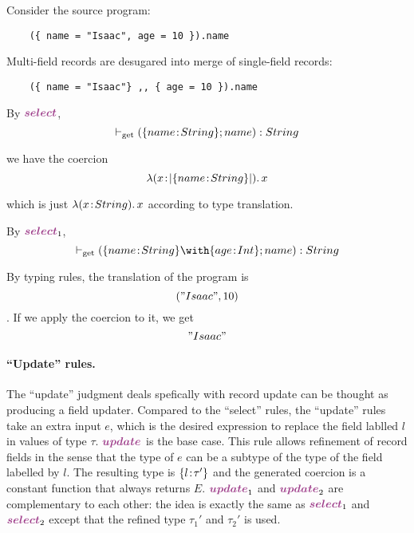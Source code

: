   Consider the source program:
  \begin{lstlisting}
    ({ name = "Isaac", age = 10 }).name
  \end{lstlisting}

  Multi-field records are desugared into merge of single-field records:
  \begin{lstlisting}
    ({ name = "Isaac"} ,, { age = 10 }).name
  \end{lstlisting}

  By $ \rulelabelselect $,
  \[ \vdash_{\textrm{get}} (\{ name \!:\! String \}; {name}) : String \]

  we have the coercion
  \[ \lambda (x \!:\! \lvert \{ name \!:\! String \} \rvert).\, x \]

  which is just $ \lambda (x \!:\! String).\, x $ according to type translation.

  By $ \rulelabelselectleft $,
  \[ \turnsget (\recty {name} {String} \andop \recty {age} {Int}; {name}) : String \]


  By typing rules, the translation of the program is
  \[ ("Isaac", 10) \]. If we apply the coercion to it, we get
  \[ "Isaac" \]


\paragraph{``Update'' rules.}

  The ``update'' judgment deals spefically with record update can be thought as
  producing a field updater. Compared to the ``select'' rules, the ``update'' rules
  take an extra input $ e $, which is the desired expression to replace the
  field lablled $ l $ in values of type $ \tau $. $ \rulelabelupdate $ is the base
  case. This rule allows refinement of record fields in the sense that the type
  of $ e $ can be a subtype of the type of the field labelled by $ l $. The
  resulting type is $ \{ l \!:\! \tau' \} $ and the generated coercion is a
  constant function that always returns $ E $. $ \rulelabelupdateleft $ and
  $ \rulelabelupdateright $ are complementary to each other: the idea is exactly the
  same as $ \rulelabelselectleft $ and $ \rulelabelselectright $ except that the refined type
  $ \tau_1' $ and $ \tau_2' $ is used.

